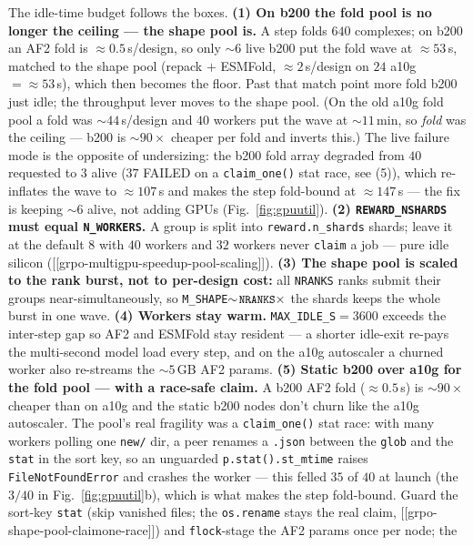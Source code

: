 \documentclass[11pt]{article}
\newcommand{\ttk}[1]{\texttt{\small #1}}
\begin{document}
\noindent The idle-time budget follows the boxes. \textbf{(1) On b200 the fold pool is no longer the
ceiling --- the shape pool is.} A step folds $640$ complexes; on b200 an AF2 fold is $\approx\!0.5$\,s/design,
so only $\sim\!6$ live b200 put the fold wave at $\approx\!53$\,s, matched to the shape pool (repack $+$
ESMFold, $\approx\!2$\,s/design on $24$ a10g $=\approx\!53$\,s), which then becomes the floor. Past that
match point more fold b200 just idle; the throughput lever moves to the shape pool. (On the old a10g
fold pool a fold was $\sim\!44$\,s/design and $40$ workers put the wave at $\sim\!11$\,min, so \emph{fold}
was the ceiling --- b200 is $\sim\!90\times$ cheaper per fold and inverts this.) The live failure mode is
the opposite of undersizing: the b200 fold array degraded from $40$ requested to $3$ alive ($37$ FAILED
on a \ttk{claim\_one()} stat race, see (5)), which re-inflates the wave to $\approx\!107$\,s and makes the
step fold-bound at $\approx\!147$\,s --- the fix is keeping $\sim\!6$ alive, not adding GPUs (Fig.~\ref{fig:gpuutil}).
\textbf{(2) \ttk{REWARD\_NSHARDS} must equal \ttk{N\_WORKERS}.} A group is split into
\ttk{reward.n\_shards} shards; leave it at the default $8$ with $40$ workers and $32$ workers never
\ttk{claim} a job --- pure idle silicon ([[grpo-multigpu-speedup-pool-scaling]]). \textbf{(3) The shape
pool is scaled to the rank burst, not to per-design cost:} all \ttk{NRANKS} ranks submit their groups
near-simultaneously, so \ttk{M\_SHAPE}$\sim\!\ttk{NRANKS}\times$ the shards keeps the whole burst in one
wave. \textbf{(4) Workers stay warm.} \ttk{MAX\_IDLE\_S}$=3600$ exceeds the inter-step gap so AF2 and
ESMFold stay resident --- a shorter idle-exit re-pays the multi-second model load every step, and on
the a10g autoscaler a churned worker also re-streams the $\sim\!5$\,GB AF2 params. \textbf{(5) Static
b200 over a10g for the fold pool --- with a race-safe claim.} A b200 AF2 fold ($\approx\!0.5$\,s) is
$\sim\!90\times$ cheaper than on a10g and the static b200 nodes don't churn like the a10g autoscaler.
The pool's real fragility was a \ttk{claim\_one()} stat race: with many workers polling one \ttk{new/}
dir, a peer renames a \ttk{*.json} between the \ttk{glob} and the \ttk{stat} in the sort key, so an
unguarded \ttk{p.stat().st\_mtime} raises \ttk{FileNotFoundError} and crashes the worker --- this
felled $35$ of $40$ at launch (the $3/40$ in Fig.~\ref{fig:gpuutil}b), which is what makes the step
fold-bound. Guard the sort-key \ttk{stat} (skip vanished files; the \ttk{os.rename} stays the real
claim, [[grpo-shape-pool-claimone-race]]) and \ttk{flock}-stage the AF2 params once per node; the
\end{document}
